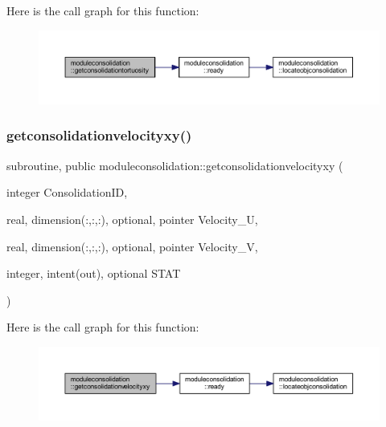 Here is the call graph for this function\+:\nopagebreak
\begin{figure}[H]
\begin{center}
\leavevmode
\includegraphics[width=350pt]{namespacemoduleconsolidation_a6f6333d1cd3299be92039f6e03e3b5b8_cgraph}
\end{center}
\end{figure}
\mbox{\label{namespacemoduleconsolidation_ad474911e58923dc9beb19e05548a5073}} 
\subsubsection{\texorpdfstring{getconsolidationvelocityxy()}{getconsolidationvelocityxy()}}
{\footnotesize\ttfamily subroutine, public moduleconsolidation\+::getconsolidationvelocityxy (\begin{DoxyParamCaption}\item[{integer}]{Consolidation\+ID,  }\item[{real, dimension(\+:,\+:,\+:), optional, pointer}]{Velocity\+\_\+U,  }\item[{real, dimension(\+:,\+:,\+:), optional, pointer}]{Velocity\+\_\+V,  }\item[{integer, intent(out), optional}]{S\+T\+AT }\end{DoxyParamCaption})}

Here is the call graph for this function\+:\nopagebreak
\begin{figure}[H]
\begin{center}
\leavevmode
\includegraphics[width=350pt]{namespacemoduleconsolidation_ad474911e58923dc9beb19e05548a5073_cgraph}
\end{center}
\end{figure}
\mbox{\label{namespacemoduleconsolidation_a1a8c6ae3e68c283ceaaa0a81fb8f531b}} 
